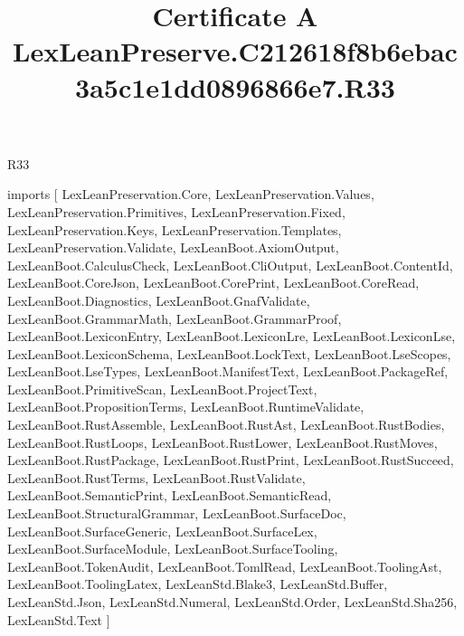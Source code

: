 \begin{lexlean}{R33}
\title{Certificate A LexLeanPreserve.C212618f8b6ebac3a5c1e1dd0896866e7.R33}
\begin{coremodule}
imports [
  LexLeanPreservation.Core,
  LexLeanPreservation.Values,
  LexLeanPreservation.Primitives,
  LexLeanPreservation.Fixed,
  LexLeanPreservation.Keys,
  LexLeanPreservation.Templates,
  LexLeanPreservation.Validate,
  LexLeanBoot.AxiomOutput,
  LexLeanBoot.CalculusCheck,
  LexLeanBoot.CliOutput,
  LexLeanBoot.ContentId,
  LexLeanBoot.CoreJson,
  LexLeanBoot.CorePrint,
  LexLeanBoot.CoreRead,
  LexLeanBoot.Diagnostics,
  LexLeanBoot.GnafValidate,
  LexLeanBoot.GrammarMath,
  LexLeanBoot.GrammarProof,
  LexLeanBoot.LexiconEntry,
  LexLeanBoot.LexiconLre,
  LexLeanBoot.LexiconLse,
  LexLeanBoot.LexiconSchema,
  LexLeanBoot.LockText,
  LexLeanBoot.LseScopes,
  LexLeanBoot.LseTypes,
  LexLeanBoot.ManifestText,
  LexLeanBoot.PackageRef,
  LexLeanBoot.PrimitiveScan,
  LexLeanBoot.ProjectText,
  LexLeanBoot.PropositionTerms,
  LexLeanBoot.RuntimeValidate,
  LexLeanBoot.RustAssemble,
  LexLeanBoot.RustAst,
  LexLeanBoot.RustBodies,
  LexLeanBoot.RustLoops,
  LexLeanBoot.RustLower,
  LexLeanBoot.RustMoves,
  LexLeanBoot.RustPackage,
  LexLeanBoot.RustPrint,
  LexLeanBoot.RustSucceed,
  LexLeanBoot.RustTerms,
  LexLeanBoot.RustValidate,
  LexLeanBoot.SemanticPrint,
  LexLeanBoot.SemanticRead,
  LexLeanBoot.StructuralGrammar,
  LexLeanBoot.SurfaceDoc,
  LexLeanBoot.SurfaceGeneric,
  LexLeanBoot.SurfaceLex,
  LexLeanBoot.SurfaceModule,
  LexLeanBoot.SurfaceTooling,
  LexLeanBoot.TokenAudit,
  LexLeanBoot.TomlRead,
  LexLeanBoot.ToolingAst,
  LexLeanBoot.ToolingLatex,
  LexLeanStd.Blake3,
  LexLeanStd.Buffer,
  LexLeanStd.Json,
  LexLeanStd.Numeral,
  LexLeanStd.Order,
  LexLeanStd.Sha256,
  LexLeanStd.Text
]


\end{coremodule}
\end{lexlean}
